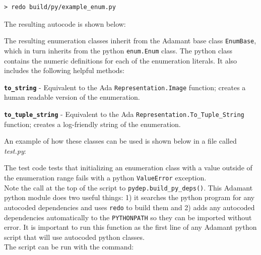 \vspace{5mm} %
\begin{verbatim}
> redo build/py/example_enum.py
\end{verbatim}
\vspace{5mm} %

The resulting autocode is shown below:


The resulting enumeration classes inherit from the Adamant base class \texttt{EnumBase}, which in turn inherits from the python \texttt{enum.Enum} class. The python class contains the numeric definitions for each of the enumeration literals. It also includes the following helpful methods:

\vspace{5mm} %
\begin{spaceditemize}
  \item \textbf{\texttt{to\_string}} - Equivalent to the Ada \texttt{Representation.Image} function; creates a human readable version of the enumeration.
  \item \textbf{\texttt{to\_tuple\_string}} - Equivalent to the Ada \texttt{Representation.To\_Tuple\_String} function; creates a log-friendly string of the enumeration.
\end{spaceditemize}
\vspace{5mm} %

An example of how these classes can be used is shown below in a file called \textit{test.py}:


The test code tests that initializing an enumeration class with a value outside of the enumeration range fails with a python \texttt{ValueError} exception. \\

Note the call at the top of the script to \texttt{pydep.build\_py\_deps()}. This Adamant python module does two useful things: 1) it searches the python program for any autocoded dependencies and uses \texttt{redo} to build them and 2) adds any autocoded dependencies automatically to the \texttt{PYTHONPATH} so they can be imported without error. It is important to run this function as the first line of any Adamant python script that will use autocoded python classes. \\

The script can be run with the command:

